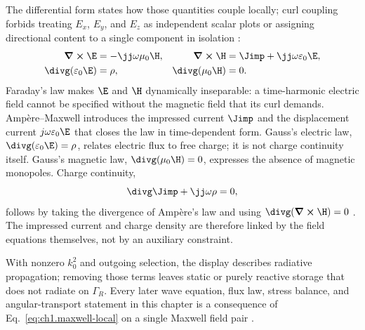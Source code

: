 The differential form states how those quantities couple locally; curl coupling forbids treating
$E_x$, $E_y$, and $E_z$ as independent scalar plots or assigning directional content to a single
component in isolation \cite{maxwell1873}:
\begin{equation}
\label{eq:ch1.maxwell-local}
\begin{aligned}
\curl \E&=-\jj\omega\mu_0\H, &
\curl \H&=\Jimp+\jj\omega\varepsilon_0\E,\\
\divg\!\left(\varepsilon_0\E\right)&=\rho, &
\divg\!\left(\mu_0\H\right)&=0.
\end{aligned}
\end{equation}
Faraday's law makes $\E$ and $\H$ dynamically inseparable: a time-harmonic electric field cannot be specified without the magnetic field that its curl demands. Amp\`ere--Maxwell introduces the impressed current $\Jimp$ and the displacement current $j\omega\varepsilon_0\E$ that closes the law in time-dependent form. Gauss's electric law, $\divg(\varepsilon_0\E)=\rho$, relates electric flux to free charge; it is not charge continuity itself. Gauss's magnetic law, $\divg(\mu_0\H)=0$, expresses the absence of magnetic monopoles. Charge continuity,
\begin{equation}
\label{eq:ch1.charge-continuity-harmonic}
\divg\Jimp+\jj\omega\rho=0,
\end{equation}
follows by taking the divergence of Amp\`ere's law and using $\divg(\curl\H)=0$ \cite{maxwell1873,stratton1941}. The impressed current and charge density are therefore linked by the field equations themselves, not by an auxiliary constraint.

With nonzero $k_0^2$ and outgoing selection, the display describes radiative propagation; removing those terms leaves static or purely reactive storage that does not radiate on $\Gamma_R$.
Every later wave equation, flux law, stress balance, and angular-transport statement in this chapter is a consequence of Eq.~\eqref{eq:ch1.maxwell-local} on a single Maxwell field pair \cite{stratton1941}.

